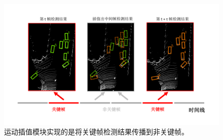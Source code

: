 \begin{figure}[t]
	\begin{center}
		\includegraphics[trim={1.1cm, 1cm, 1.5cm, 1cm}, clip, width=\textwidth]{imgs/timeline_interpolation.pdf}
	\end{center}
	\vspace{-0.8cm}
	\caption{运动插值模块实现的是将关键帧检测结果传播到非关键帧。}
	\label{fig:timeline_interpolation}
\end{figure}

